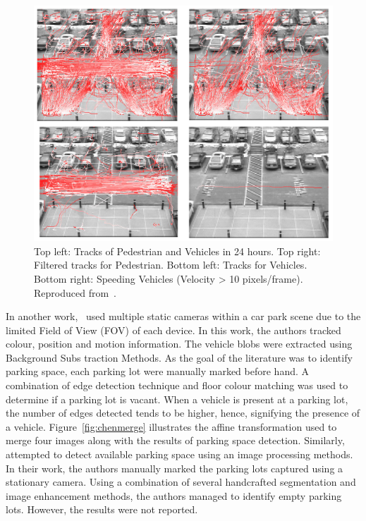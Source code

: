 \begin{figure}[hbt!]
  \centering
  \includegraphics[width=.6\textwidth]{image/lit/ibm.png}
  \caption[Top left: Tracks of Pedestrian and Vehicles in 24 hours. Top right: Filtered tracks for Pedestrian. Bottom left: Tracks for Vehicles. Bottom right: Speeding Vehicles (Velocity > 10  pixels/frame).] {Top left: Tracks of Pedestrian and Vehicles in 24 hours. Top right: Filtered tracks for Pedestrian. Bottom left: Tracks for Vehicles. Bottom right: Speeding Vehicles (Velocity > 10 pixels/frame). Reproduced from~\cite{hampapur2004s3}.}
\label{fig:ibmsurveillance}
\end{figure}

In another work,~ used multiple static cameras within a car park scene due to the limited Field of View (FOV) of each device. In this work, the authors tracked colour, position and motion information. The vehicle blobs were extracted using Background Subs traction Methods. As the goal of the literature was to identify parking space, each parking lot were manually marked before hand. A combination of edge detection technique and floor colour matching was used to determine if a parking lot is vacant. When a vehicle is present at a parking lot, the number of edges detected tends to be higher, hence, signifying the presence of a vehicle. 
Figure~\ref{fig:chenmerge} illustrates the affine transformation used to merge four images along with the results of parking space detection. 
Similarly,~ attempted to detect available parking space using an image processing methods. In their work, the authors manually marked the parking lots captured using a stationary camera. Using a combination of several handcrafted segmentation and image enhancement methods, the authors managed to identify empty parking lots. However, the results were not reported.


